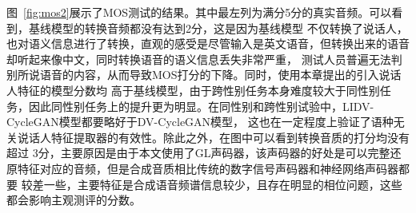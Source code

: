 图~\ref{fig:mos2}展示了MOS测试的结果。其中最左列为满分5分的真实音频。可以看到，基线模型的转换音频都没有达到2分，这是因为基线模型
不仅转换了说话人，也对语义信息进行了转换，直观的感受是尽管输入是英文语音，但转换出来的语音却听起来像中文，同时转换语音的语义信息丢失非常严重，
测试人员普遍无法判别所说语音的内容，从而导致MOS打分的下降。同时，使用本章提出的引入说话人特征的模型分数均
高于基线模型，由于跨性别任务本身难度较大于同性别任务，因此同性别任务上的提升更为明显。在同性别和跨性别试验中，LIDV-CycleGAN模型都要略好于DV-CycleGAN模型，
这也在一定程度上验证了语种无关说话人特征提取器的有效性。除此之外，在图中可以看到转换音质的打分均没有超过
3分，主要原因是由于本文使用了GL声码器，该声码器的好处是可以完整还原特征对应的音频，但是合成音质相比传统的数字信号声码器和神经网络声码器都要
较差一些，主要特征是合成语音频谱信息较少，且存在明显的相位问题，这些都会影响主观测评的分数。

